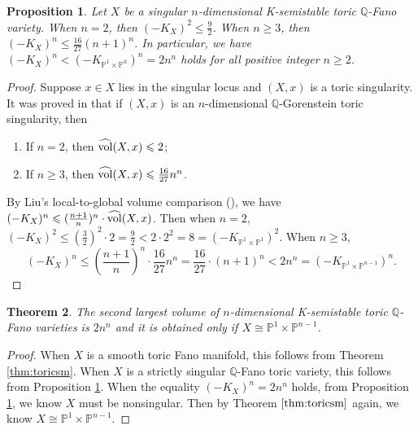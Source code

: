 \documentclass[12pt]{amsart}
\newcommand{\hvol}{{\widehat{\rm vol}}}
\newtheorem{thm}{Theorem}[section]
\newtheorem{prop}[thm]{Proposition}
\theoremstyle{definition}
\def\vol{{\rm vol}}
\newcommand{\IP}{{\mathbb P}}
\newcommand{\IQ}{{\mathbb Q}}
\newcommand{\lee}{\leqslant}
\newcommand{\gee}{\geqslant}
\begin{document}
\begin{prop}\label{prop:singulartoric}
    Let $X$ be a singular $n$-dimensional K-semistable toric $\IQ$-Fano variety. When $n=2$, then $(-K_X)^2\lee \frac{9}{2}$. When $n\gee 3$, then $(-K_X)^n \lee \frac{16}{27}(n+1)^n$. In particular, we have $(-K_X)^n< (-K_{\IP^1\times \IP^n})^n = 2n^n$ holds for all positive integer $n \gee 2$.
\end{prop}
\begin{proof}
    Suppose $x\in X$ lies in the singular locus and $(X,x)$ is a toric singularity. It was proved in \cite[Theorem 2]{MS24} that if $(X,x)$ is an $n$-dimensional $\IQ$-Gorenstein toric singularity, then 
    \begin{enumerate}
        \item If $n= 2$, then $\hvol(X,x)\lee 2$;
        \item If $n\geq 3$, then $\hvol(X,x) \lee \frac{16}{27}n^n$.
    \end{enumerate}
By Liu's local-to-global volume comparison (\cite{Liu18}), we have $(-K_X)^n \lee (\frac{n+1}{n})^n\cdot \hvol(X,x)$. Then when $n=2$, $(-K_X)^2 \lee (\frac{3}{2})^2\cdot 2 = \frac{9}{2}<2\cdot 2^2 = 8 = (-K_{\IP^1\times \IP^1})^2$. When $n\gee 3$, 
$$
(-K_X)^n \lee (\frac{n+1}{n})^n\cdot \frac{16}{27}n^n  =\frac{16}{27}\cdot (n+1)^n<2n^n = (-K_{\IP^1\times \IP^{n-1}})^n.
$$
\end{proof}
\begin{thm}\label{thm:vtoric}
 The second largest volume of $n$-dimensional K-semistable toric $\IQ$-Fano varieties is $2n^n$ and it is obtained only if $X\cong \IP^1\times \IP^{n-1}$.    
\end{thm}
\begin{proof}
    When $X$ is a smooth toric Fano manifold, this follows from Theorem \ref{thm:toricsm}. When $X$ is a strictly singular $\IQ$-Fano toric variety, this follows from Proposition \ref{prop:singulartoric}. When the equality $(-K_X)^n = 2n^n$ holds, from Proposition \ref{prop:singulartoric}, we know $X$ must be nonsingular. Then by Theorem $\ref{thm:toricsm}$ again, we know $X\cong \IP^1\times \IP^{n-1}$.
\end{proof}
\end{document}
